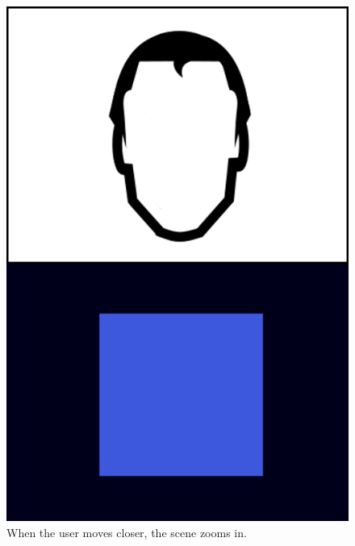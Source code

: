\begin{figure}
  \centering
  \includegraphics[scale=0.3]{images/head-close}
  \caption{When the user moves closer, the scene zooms in.}
  \label{fig:faceclose}
\end{figure}




